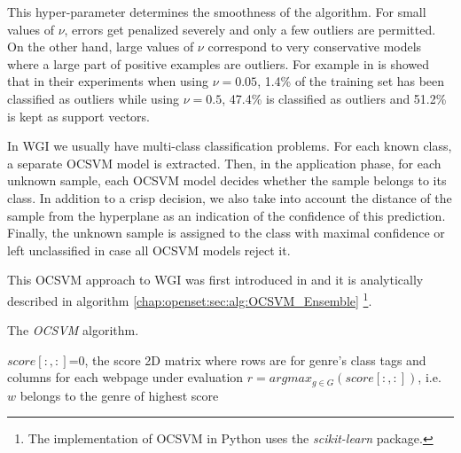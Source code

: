 This hyper-parameter determines the smoothness of the algorithm. For small values of $\nu$, errors get penalized severely and only a few outliers are permitted. On the other hand, large values of $\nu$ correspond to very conservative models where a large part of  positive examples are outliers. For example in \parencite{scholkopf1999estimating} is showed that in their experiments when using $\nu=0.05$, 1.4\% of the training set has been classified as outliers while using $\nu=0.5$, 47.4\% is classified as outliers and 51.2\% is kept as support vectors.

In WGI we usually have multi-class classification problems. For each known class, a separate OCSVM model is extracted. Then, in the application phase, for each unknown sample, each OCSVM model decides whether the sample belongs to its class. In addition to a crisp decision, we also take into account the distance of the sample from the hyperplane as an indication of the confidence of this prediction. Finally, the unknown sample is assigned to the class with maximal confidence or left unclassified in case all OCSVM models reject it. 

This OCSVM approach to WGI was first introduced in \parencite{pritsos2013open} and it is analytically described in algorithm \ref{chap:openset:sec:alg:OCSVM_Ensemble} \footnote{The implementation of OCSVM in Python uses the \textit{scikit-learn} package.}.

\hfill

\begin{algorithm}[t]
\caption{The \textit{OCSVM} algorithm.}\label{chap:openset:sec:alg:OCSVM_Ensemble}
$score[:, :]$=0, the score 2D matrix where rows are for genre's class tags and columns for each webpage under evaluation
{
        $r = argmax_{g \in G}(score[:, :])$, i.e. $w$ belongs to the genre of highest score\;
    }
\end{algorithm}

